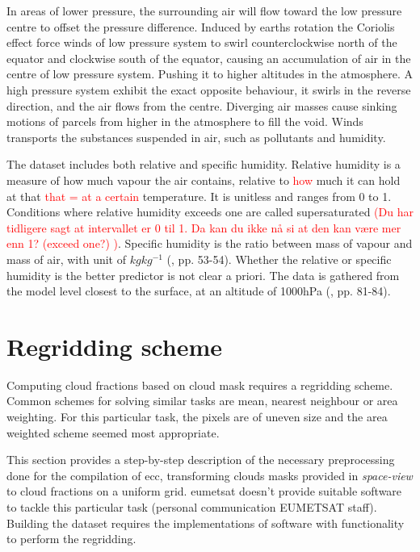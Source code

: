 In areas of lower pressure, the surrounding air will flow toward the low pressure centre to offset the pressure difference. Induced by earths rotation the Coriolis effect force winds of low pressure system to swirl counterclockwise north of the equator and clockwise south of the equator, causing an accumulation of air in the centre of low pressure system. Pushing it to higher altitudes in the atmosphere. A high pressure system exhibit the exact opposite behaviour, it swirls in the reverse direction, and the air flows from the centre. Diverging air masses cause sinking motions of parcels from higher in the atmosphere to fill the void. 
Winds transports the substances suspended in air, such as pollutants and humidity.

The dataset includes both relative and specific humidity. Relative humidity is a measure of how much vapour the air contains, relative to \textcolor{red}{how} much it can hold at that \textcolor{red}{that = at a certain} temperature. It is unitless and ranges from 0 to 1. Conditions where relative humidity exceeds one are called supersaturated \textcolor{red}{(Du har tidligere sagt at intervallet er 0 til 1. Da kan du ikke nå si at den kan være mer enn 1? (exceed one?) )}. Specific humidity is the ratio between mass of vapour and mass of air, with unit of $kg kg^{-1}$ (\cite{lohmann2016}, pp. 53-54). Whether the relative or specific humidity is the better predictor is not clear a priori. The data is gathered from the model level closest to the surface, at an altitude of 1000hPa (\cite{lohmann2016}, pp. 81-84). 

\section{Regridding scheme} \label{sec:remapping}
Computing cloud fractions based on cloud mask requires a regridding scheme. Common schemes for solving similar tasks are mean, nearest neighbour or area weighting. For this particular task, the pixels are of uneven size and the area weighted scheme seemed most appropriate. 

This section provides a step-by-step description of the necessary preprocessing done for the compilation of \acrshort{ecc}, transforming clouds masks provided in \textit{space-view} to cloud fractions on a uniform grid. \acrshort{eumetsat} doesn't provide suitable software to tackle this particular task (personal communication EUMETSAT staff). Building the dataset requires the implementations of software with functionality to perform the regridding.


